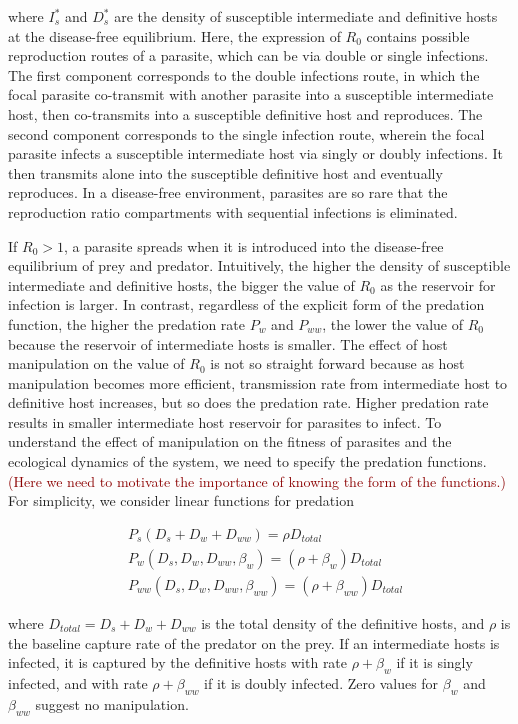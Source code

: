 \documentclass[11pt]{article}
\newcommand{\cha}[1]{\textcolor{darkred}{(#1)}}
\begin{document}
where $I_s^*$ and $D_s^*$ are the density of susceptible intermediate and definitive hosts at the disease-free equilibrium. 
Here, the expression of $R_0$ contains possible reproduction routes of a parasite, which can be via double or single infections. 
The first component corresponds to the double infections route, in which the focal parasite co-transmit with another parasite into a susceptible intermediate host, then co-transmits into a susceptible definitive host and reproduces. 
The second component corresponds to the single infection route, wherein the focal parasite infects a susceptible intermediate host via singly or doubly infections. 
It then transmits alone into the susceptible definitive host and eventually reproduces. 
In a disease-free environment, parasites are so rare that the reproduction ratio compartments with sequential infections is eliminated. 


If $R_0 > 1$, a parasite spreads when it is introduced into the disease-free equilibrium of prey and predator.
Intuitively, the higher the density of susceptible intermediate and definitive hosts, the bigger the value of $R_0$ as the reservoir for infection is larger. In contrast, regardless of the explicit form of the predation function, the higher the predation rate $P_w$ and $P_{ww}$, the lower the value of $R_0$ because the reservoir of intermediate hosts is smaller. 
The effect of host manipulation on the value of $R_0$ is not so straight forward because as host manipulation becomes more efficient, transmission rate from intermediate host to definitive host increases, but so does the predation rate. Higher predation rate results in smaller intermediate host reservoir for parasites to infect. To understand the effect of manipulation on the fitness of parasites and the ecological dynamics of the system, we need to specify the predation functions. 
\cha{Here we need to motivate the importance of knowing the form of the functions.}
For simplicity, we consider linear functions for predation 

\begin{align*}
& P_s(D_s + D_w + D_{ww}) = \rho D_{total}  \\
& P_w(D_s, D_w, D_{ww}, \beta_w) = (\rho + \beta_w) D_{total} \\
& P_{ww}(D_s, D_w, D_{ww}, \beta_{ww}) =  (\rho + \beta_{ww})D_{total}
\end{align*}

where $D_{total} = D_s + D_w + D_{ww}$ is the total density of the definitive hosts, and $\rho$ is the baseline capture rate of the predator on the prey. If an intermediate hosts is infected, it is captured by the definitive hosts with rate $\rho + \beta_w$ if it is singly infected, and with rate $\rho + \beta_{ww}$ if it is doubly infected. Zero values for $\beta_w$ and $\beta_{ww}$ suggest no manipulation. 
\end{document}
